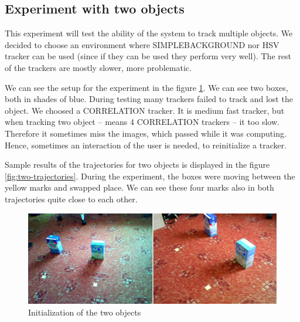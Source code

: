 \subsection{Experiment with two objects}

This experiment will test the ability of the system to track multiple objects.
We decided to choose an environment where SIMPLEBACKGROUND nor HSV tracker can
be used (since if they can be used they perform very well). The rest of the
trackers are mostly slower, more problematic.

We can see the setup for the experiment in the figure \ref{fig:two-init}. We
can see two boxes, both in shades of blue. During testing many trackers failed
to track and lost the object. We choosed a CORRELATION tracker. It is medium
fast tracker, but when tracking two object -- means 4 CORRELATION trackers --
it too slow. Therefore it sometimes miss the images, which passed while it was
computing. Hence, sometimes an interaction of the user is needed, to
reinitialize a tracker.

Sample results of the trajectories for two objects is displayed in the figure
\ref{fig:two-trajectories}. During the experiment, the boxes were moving
between the yellow marks and swapped place. We can see these four marks also in
both trajectories quite close to each other. 

\begin{figure}
\includegraphics[width=\linewidth]{img/experiments/two-objects.png}
\caption{Initialization of the two objects}
\label{fig:two-init}
\end{figure}


